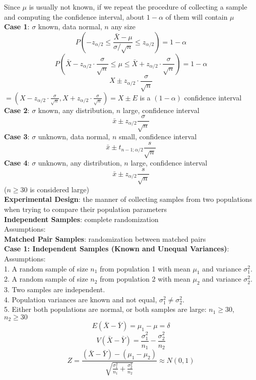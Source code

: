 \documentclass{article}
\begin{document}
\begin{multicols*}{3}
Since $\mu$ is usually not known, if we repeat the procedure of collecting a sample and computing the confidence interval, about $1-\alpha$ of them will contain $\mu$\\
\textbf{Case 1}: $\sigma$ known, data normal, $n$ any size \\
$$P(-z_{\alpha/2}\leq\frac{\bar{X}-\mu}{\sigma/\sqrt{n}}\leq z_{\alpha/2})=1-\alpha$$
$$P(\bar{X}-z_{\alpha/2}\cdot\frac{\sigma}{\sqrt{n}}\leq\mu\leq\bar{X}+z_{\alpha/2}\cdot\frac{\sigma}{\sqrt{n}})=1-\alpha$$
$$X\pm z_{\alpha/2}\cdot\frac{\sigma}{\sqrt{n}}$$ $=(X-z_{\alpha/2}\cdot\frac{\sigma}{\sqrt{n}},X+z_{\alpha/2}\cdot\frac{\sigma}{\sqrt{n}})=X\pm E$ is a $(1-\alpha)$ confidence interval\\
\textbf{Case 2}: $\sigma$ known, any distribution, $n$ large, confidence interval $$\bar{x}\pm z_{\alpha/2}\frac{\sigma}{\sqrt{n}}$$
\textbf{Case 3}: $\sigma$ unknown, data normal, $n$ small, confidence interval $$\bar{x}\pm t_{n-1;\alpha/2}\frac{s}{\sqrt{n}}$$ 
\textbf{Case 4}: $\sigma$ unknown, any distribution, $n$ large, confidence interval $$\bar{x}\pm z_{\alpha/2}\frac{s}{\sqrt{n}}$$
($n \geq30$ is considered large)\\
\textbf{Experimental Design}: the manner of collecting samples from two populations when trying to compare their population parameters \\
\textbf{Independent Samples}: complete randomization \\
Assumptions: \\
\textbf{Matched Pair Samples}: randomization between matched pairs \\
\textbf{Case 1: Independent Samples (Known and Unequal Variances)}: \\
Assumptions: \\
1. A random sample of size $n_1$ from population 1 with mean $\mu_1$ and variance $\sigma_1^2$. \\
2. A random sample of size $n_2$ from population 2 with mean $\mu_2$ and variance $\sigma_2^2$. \\
3. Two samples are independent. \\
4. Population variances are known and not equal, $\sigma_1^2\not=\sigma_2^2$. \\
5. Either both populations are normal, or both samples are large: $n_1\geq 30$, $n_2\geq 30$
$$E(\bar{X}-\bar{Y})=\mu_1-\mu=\delta$$
$$V(\bar{X}-\bar{Y})=\frac{\sigma_1^2}{n_1}-\frac{\sigma_2^2}{n_2}$$
$$Z=\frac{(\bar{X}-\bar{Y})-(\mu_1-\mu_2)}{\sqrt{\frac{\sigma_1^2}{n_1}+\frac{\sigma_2^2}{n_2}}}\approx N(0,1)$$\\

\end{multicols*}
\end{document}

